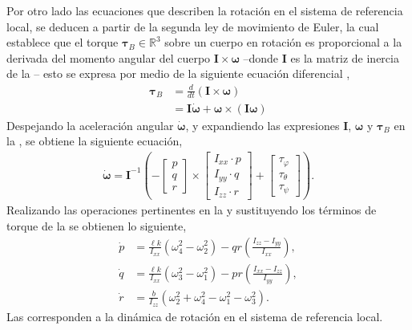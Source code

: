 Por otro lado las ecuaciones que describen la rotación en el sistema de referencia local, se deducen a partir de la segunda ley de movimiento de Euler, la cual establece que el torque $\bm{\tau}_B\in \mathbb{R}^3$ sobre un cuerpo en rotación es proporcional a la derivada del momento angular del cuerpo $\mathbf{I}\times \bm{\omega}$ –donde $\mathbf{I}$ es la matriz de inercia de la – esto se expresa por medio de la siguiente ecuación diferencial \cite{fitzpatrick2011}, 
\begin{equation}
    \begin{aligned}
        \bm{\tau}_B &= \frac{d}{dt}\left(\mathbf{I}\times \bm{\omega}\right) \\
        & = \mathbf{I}\dot{\bm{\omega}} + \bm{\omega} \times (\mathbf{I}\bm{\omega})
    \end{aligned}
    \label{eq:euler_second_law}
\end{equation}
Despejando la aceleración angular $\dot{\bm{\omega}}$, y expandiendo las expresiones $\mathbf{I}$, $\bm\omega$ y $\bm{\tau}_B$ en la , se obtiene la siguiente ecuación,
\begin{align}
    \dot{\bm{\omega}} = 
    \mathbf{I}^{-1} \left(
        - \begin{bmatrix}
            p \\
            q \\
            r 
        \end{bmatrix}
        \times
        \begin{bmatrix}
            I_{xx} \cdot p \\
            I_{yy} \cdot q \\
            I_{zz} \cdot r
        \end{bmatrix}
        + 
        \begin{bmatrix}
            \tau_{\varphi} \\
            \tau_{\theta} \\
            \tau_{\psi}
        \end{bmatrix}
    \right).
    \label{eq:angular_acceleration}
\end{align}
Realizando las operaciones pertinentes en la  y sustituyendo los términos de torque de la  se obtienen lo siguiente,
\begin{align}
\dot p &= \frac{\ell k}{I_{xx}}\left(\omega_4^2 - \omega_2^2\right)-qr \left(\frac{I_{zz} -I_{yy}}{I_{xx}}\right), \label{eq:p}\\
    \dot q &=  \frac{\ell k}{I_{xx}}\left(\omega_3^2 - \omega_1^2\right) - pr \left(\frac{I_{xx} -I_{zz}}{I_{yy}}\right), \label{eq:q}\\
    \dot r &= \frac{b}{I_{zz}}\left(\omega_2^2 + \omega_4^2 - \omega_1^2 - \omega_3^2\right) \label{eq:r}.
\end{align}
Las  corresponden a la dinámica de rotación en el sistema de referencia local.


